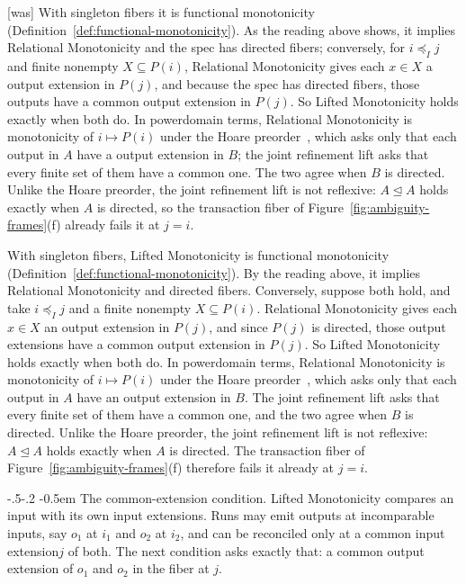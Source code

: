 \documentclass[sigconf]{cidr-2027}
\makeatletter
\theoremstyle{remark}
\renewcommand\paragraph{\@startsection{paragraph}{4}{\z@}%
  {-.5\baselineskip \@plus -2\p@ \@minus -.2\p@}%
  {-0.5em}%
  {\normalfont\bfseries}}
\newcommand{\InputOrd}{\preceq_I}
\newcommand{\LiftedOrd}{\trianglelefteq}
\newcommand{\indesc}{input extension\xspace} %
\newcommand{\outnoun}{output extension\xspace}%
\newcommand{\outnouns}{output extensions\xspace}
\newcommand{\fiber}[1]{P(#1)}
\makeatother
\begin{document}
{\footnotesize\color{black!50}\noindent\textsf{[was]} With singleton fibers it is functional monotonicity
(Definition~\ref{def:functional-monotonicity}).  As the reading above shows,
it implies Relational Monotonicity and the spec has directed fibers;
conversely, for $i\InputOrd j$ and finite nonempty $X\subseteq\fiber{i}$,
Relational Monotonicity gives each $x\in X$ a \outnoun in $\fiber{j}$, and
because the spec has directed fibers, those outputs have a common
\outnoun in $\fiber{j}$.  So Lifted Monotonicity
holds exactly when both do.  In powerdomain terms, Relational Monotonicity
is monotonicity of $i\mapsto\fiber{i}$ under the Hoare
preorder~\cite{abramsky1994domain}, which asks only that each output in $A$
have a \outnoun in $B$; the joint refinement lift asks that every finite set of them have
a common one.  The two agree when $B$ is directed.  Unlike the Hoare preorder,
the joint refinement lift is not reflexive: $A\LiftedOrd A$ holds exactly when $A$ is
directed, so the transaction fiber of Figure~\ref{fig:ambiguity-frames}(f)
already fails it at $j=i$.\par}

\color{blue!70!black}With singleton fibers, Lifted Monotonicity is functional monotonicity
(Definition~\ref{def:functional-monotonicity}).  By the reading above, it
implies Relational Monotonicity and directed fibers.  Conversely, suppose both
hold, and take $i\InputOrd j$ and a finite nonempty $X\subseteq\fiber{i}$.
Relational Monotonicity gives each $x\in X$ an \outnoun in $\fiber{j}$, and
since $\fiber{j}$ is directed, those \outnouns have a common \outnoun in
$\fiber{j}$.  So Lifted Monotonicity holds exactly when both do.  In
powerdomain terms, Relational Monotonicity is monotonicity of
$i\mapsto\fiber{i}$ under the Hoare preorder~\cite{abramsky1994domain}, which
asks only that each output in $A$ have an \outnoun in $B$.  The joint
refinement lift asks that every finite set of them have a common one, and the
two agree when $B$ is directed.  Unlike the Hoare preorder, the joint
refinement lift is not reflexive: $A\LiftedOrd A$ holds exactly when $A$ is
directed.  The transaction fiber of Figure~\ref{fig:ambiguity-frames}(f)
therefore fails it already at $j=i$.\color{black}

\paragraph{The common-extension condition.}
Lifted Monotonicity compares an input with its
own input extensions. Runs may emit outputs at incomparable inputs, say
$o_1$ at $i_1$ and $o_2$ at $i_2$, and can be reconciled only at a common
\indesc $j$ of both. The next condition asks exactly that: a common
\outnoun of $o_1$ and $o_2$ in the fiber at $j$.
\end{document}
